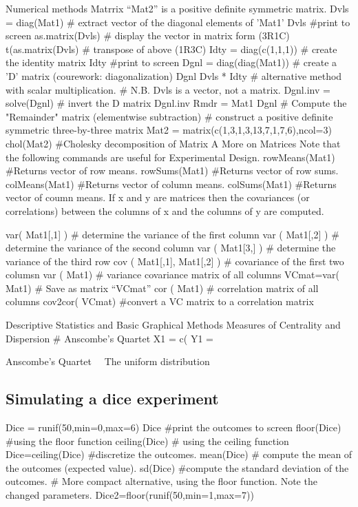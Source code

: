 Numerical methods
Matrrix “Mat2” is a positive definite symmetric matrix.
Dvls = diag(Mat1)		# extract vector of the diagonal elements of 'Mat1'
Dvls				#print to screen
as.matrix(Dvls)			# display the vector in matrix form (3R1C)
t(as.matrix(Dvls)		# transpose of above	(1R3C)
Idty = diag(c(1,1,1))		# create the identity matrix
Idty				#print to screen
Dgnl = diag(diag(Mat1))	# create a 'D' matrix 	(courework: diagonalization)
Dgnl				
Dvls * Idty			# alternative method with scalar multiplication.
				# N.B.  Dvls is a vector, not a matrix.
Dgnl.inv = solve(Dgnl)		# invert the D matrix
Dgnl.inv		
Rmdr = Mat1 Dgnl		# Compute the "Remainder" matrix (elementwise subtraction)
# construct a positive definite symmetric three-by-three matrix
Mat2 = matrix(c(1,3,1,3,13,7,1,7,6),ncol=3)
chol(Mat2)			#Cholesky decomposition of Matrix A
More on Matrices
Note that the following commands are useful for Experimental Design.
rowMeans(Mat1) 			#Returns vector of row means. 
rowSums(Mat1) 			#Returns vector of row sums.  
colMeans(Mat1) 			#Returns vector of column means.  
colSums(Mat1) 				#Returns vector of coumn means.  
If x and y are matrices then the covariances (or correlations) between the columns of x and the columns of y are computed.


var( Mat1[,1] )			# determine the variance of the first column 
var ( Mat1[,2] )			# determine the variance of the second column
var ( Mat1[3,] )			# determine the variance of the third row
cov ( Mat1[,1], Mat1[,2] )	# covariance of the first two columsn
var ( Mat1)			# variance covariance matrix of all columns
VCmat=var( Mat1)		# Save as matrix “VCmat”
cor ( Mat1)			# correlation matrix of all columns
cov2cor( VCmat)		#convert a VC matrix to a correlation matrix

 
Descriptive Statistics and Basic Graphical Methods
Measures of Centrality and Dispersion
# Anscombe’s  Quartet
X1 = c(
Y1 =
 

Anscombe’s Quartet 
The uniform distribution

\subsection{Simulating a dice experiment}
Dice = runif(50,min=0,max=6)	
Dice				#print the outcomes to screen
floor(Dice)			#using the floor function
ceiling(Dice)			# using the ceiling function
Dice=ceiling(Dice)		#discretize the outcomes.
mean(Dice)			# compute the mean of the outcomes (expected value).
sd(Dice)			#compute the standard deviation of the outcomes.
# More compact alternative, using the floor function. Note the changed parameters.
Dice2=floor(runif(50,min=1,max=7))	

